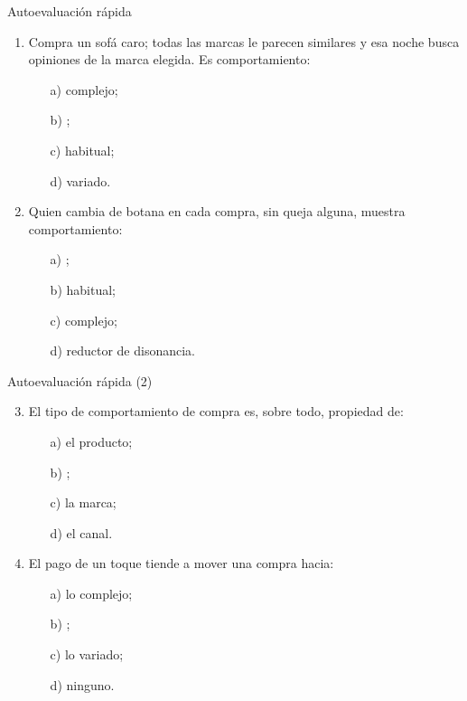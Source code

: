 \documentclass[aspectratio=169,xcolor=dvipsnames]{beamer}
\begin{document}
\begin{frame}{Autoevaluación rápida}
\footnotesize
\begin{enumerate}
  \item Compra un sofá caro; todas las marcas le parecen similares y esa noche busca opiniones de la marca elegida. Es comportamiento:
  \begin{itemize}
    \item[a)] complejo; \item[b)] ; \item[c)] habitual; \item[d)] variado.
  \end{itemize}
  \item Quien cambia de botana en cada compra, sin queja alguna, muestra comportamiento:
  \begin{itemize}
    \item[a)] ; \item[b)] habitual; \item[c)] complejo; \item[d)] reductor de disonancia.
  \end{itemize}
\end{enumerate}
\end{frame}

\begin{frame}{Autoevaluación rápida (2)}
\footnotesize
\begin{enumerate}
\setcounter{enumi}{2}
  \item El tipo de comportamiento de compra es, sobre todo, propiedad de:
  \begin{itemize}
    \item[a)] el producto; \item[b)] ; \item[c)] la marca; \item[d)] el canal.
  \end{itemize}
  \item El pago de un toque tiende a mover una compra hacia:
  \begin{itemize}
    \item[a)] lo complejo; \item[b)] ; \item[c)] lo variado; \item[d)] ninguno.
  \end{itemize}
\end{enumerate}
\end{frame}
\end{document}

